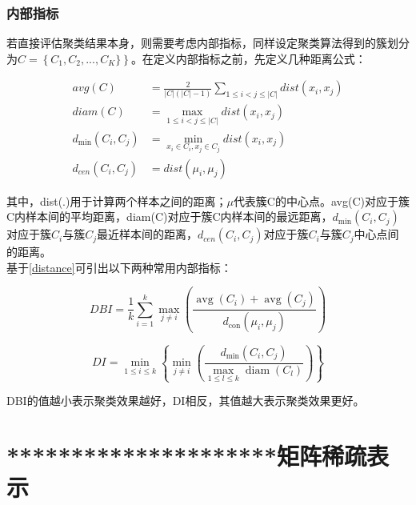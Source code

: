 \subsubsection{内部指标}

若直接评估聚类结果本身，则需要考虑内部指标，同样设定聚类算法得到的簇划分为$C=\left\{C_1,C_2,...,C_K\}\right\}$。在定义内部指标之前，先定义几种距离公式：

\begin{equation}
\label{distance}
\begin{aligned}
avg(C) &=\frac{2}{|C|(|C|-1)} \sum_{1 \leqslant i<j \leqslant|C|} dist\left(x_{i}, x_{j}\right) \\
diam(C) &=\max _{1 \leqslant i<j \leqslant|C|} dist\left(x_{i}, x_{j}\right) \\
d_{\min }\left(C_{i}, C_{j}\right) &=\min _{x_{i} \in C_{i}, x_{j} \in C_{j}} dist\left(x_{i}, x_{j}\right) \\
d_{cen}\left(C_{i}, C_{j}\right) &=dist\left(\mu_{i}, \mu_{j}\right)
\end{aligned}
\end{equation}

其中，dist(.)用于计算两个样本之间的距离；$\mu$代表簇C的中心点。avg(C)对应于簇C内样本间的平均距离，diam(C)对应于簇C内样本间的最远距离，$d_{\min }\left(C_{i}, C_{j}\right)$对应于簇$C_i$与簇$C_j$最近样本间的距离，$d_{cen}\left(C_{i}, C_{j}\right)$对应于簇$C_i$与簇$C_j$中心点间的距离。\\
基于\ref{distance}可引出以下两种常用内部指标：

\begin{equation}
\label{DBI}
DBI=\frac{1}{k} \sum_{i=1}^{k} \max _{j \neq i}\left(\frac{\operatorname{avg}\left(C_{i}\right)+\operatorname{avg}\left(C_{j}\right)}{d_{\operatorname{con}}\left(\mu_{i}, \mu_{j}\right)}\right)
\end{equation}

\begin{equation}
\label{DI}
DI=\min _{1 \leqslant i \leqslant k}\left\{\min _{j \neq i}\left(\frac{d_{\min }\left(C_{i}, C_{j}\right)}{\max _{1 \leqslant l \leqslant k} \operatorname{diam}\left(C_{l}\right)}\right)\right\}
\end{equation}

DBI的值越小表示聚类效果越好，DI相反，其值越大表示聚类效果更好。



\section{*********************矩阵稀疏表示}


